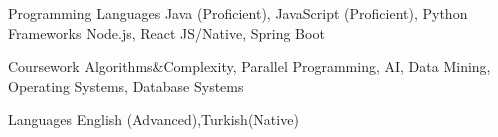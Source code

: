 

\begin{cvskills}

  \cvskill
    {Programming Languages} %
    {Java (Proficient), JavaScript (Proficient), Python} %
  \cvskill
    {Frameworks} %
    {Node.js, React JS/Native, Spring Boot } %

  \cvskill
  {Coursework}
  {Algorithms\&Complexity, Parallel Programming, AI, Data Mining, Operating Systems, Database Systems }

  \cvskill
    {Languages} %
    {English (Advanced),Turkish(Native)} %

\end{cvskills}
